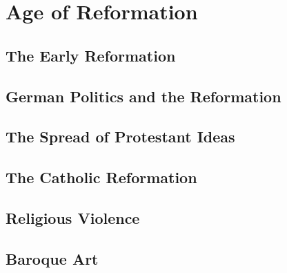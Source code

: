 \documentclass[../euro.tex]{subfiles}
\begin{document}
\chapter{Age of Reformation}
\section{The Early Reformation}
\section{German Politics and the Reformation}
\section{The Spread of Protestant Ideas}
\section{The Catholic Reformation}
\section{Religious Violence}
\section{Baroque Art}
\end{document}
